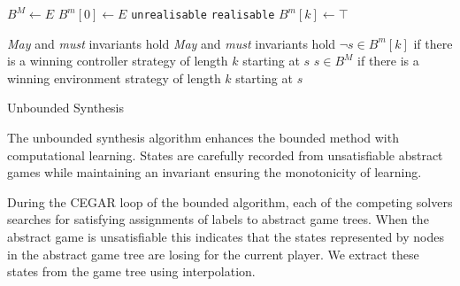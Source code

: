 \documentclass{llncs}
\begin{document}
\begin{algorithm}[h]
    \begin{algorithmic}[1]
            \State $B^M \gets E$
            \State $B^m[0] \gets E$
                    \Return \texttt{unrealisable} 
                \EndIIf
                    \Return \texttt{realisable} 
                \EndIIf
                \State $B^m[k] \gets \top$
                \State {}
            \EndFor
        \EndFunction
    \end{algorithmic}

    \begin{algorithmic}
        \Require \emph{May} and \emph{must} invariants hold
        \Ensure \emph{May} and \emph{must} invariants hold
        \Ensure $\lnot s \in B^m[k]$ if there is a winning controller strategy of length $k$ starting at $s$
        \Ensure $s \in B^M$ if there is a winning environment strategy of length $k$ starting at $s$
            \State \Return {}
        \EndFunction
    \end{algorithmic}
    \caption{Unbounded Synthesis}
    \label{alg:unbounded}
\end{algorithm}

The unbounded synthesis algorithm enhances the bounded method with
computational learning. States are carefully recorded from unsatisfiable
abstract games while maintaining an invariant ensuring the monotonicity of
learning.

During the CEGAR loop of the bounded algorithm, each of the competing solvers
searches for satisfying assignments of labels to abstract game trees. When the
abstract game is unsatisfiable this indicates that the states represented by
nodes in the abstract game tree are losing for the current player. We extract
these states from the game tree using interpolation.
\end{document}
